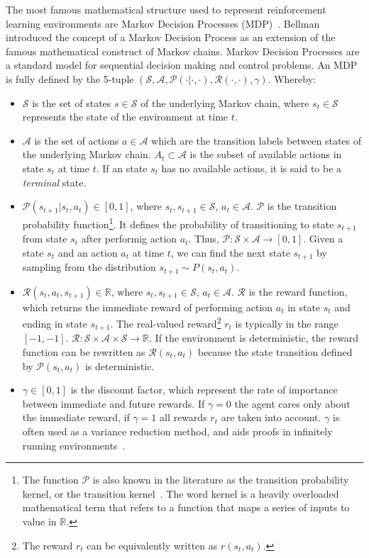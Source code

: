 \documentclass{../main.tex}{subfiles}
\begin{document}
The most famous mathematical structure used to represent reinforcement learning environments are Markov Decision Processes (MDP)~\citep{Bellman1957}. Bellman introduced the concept of a Markov Decision Process as an extension of the famous mathematical construct of Markov chains. Markov Decision Processes are a standard model for sequential decision making and control problems. An MDP is fully defined by the 5-tuple $(\mathcal{S}, \mathcal{A}, \mathcal{P(\cdot | \cdot, \cdot)}, \mathcal{R(\cdot, \cdot)}, \gamma)$. Whereby:

\begin{itemize}
\item $\mathcal{S}$ is the set of states $s \in \mathcal{S}$ of the underlying Markov chain, where $s_t \in \mathcal{S}$ represents the state of the environment at time $t$.
\item $\mathcal{A}$ is the set of actions $a \in \mathcal{A}$ which are the transition labels between states of the underlying Markov chain. $A_t \subset \mathcal{A}$ is the subset of available actions in state $s_t$ at time $t$. If an state $s_t$ has no available actions, it is said to be a \textit{terminal} state.
\item $\mathcal{P}(s_{t+1} | s_t, a_t) \in [0, 1]$, where $s_t, s_{t+1} \in \mathcal{S}$, $a_t \in \mathcal{A}$. $\mathcal{P}$ is the transition probability function\footnote{The function $\mathcal{P}$ is also known in the literature as the transition probability kernel, or the transition kernel~\citep{Tamar2017}. The word kernel is a heavily overloaded mathematical term that refers to a function that maps a series of inputs to value in $\mathbb{R}$.}. It defines the probability of transitioning to state $s_{t+1}$ from state $s_t$ after performig action $a_t$. Thus, $\mathcal{P}: \mathcal{S} \times \mathcal{A} \to [0,1]$. Given a state $s_t$ and an action $a_t$ at time $t$, we can find the next state $s_{t+1}$ by sampling from the distribution $s_{t+1} \sim P(s_t, a_t)$.%
\item $\mathcal{R}(s_t, a_t, s_{t+1}) \in \mathbb{R}$, where $s_t, s_{t+1} \in \mathcal{S}$, $a_t \in \mathcal{A}$. $\mathcal{R}$ is the reward function, which returns the immediate reward of performing action $a_t$ in state $s_t$ and ending in state $s_{t+1}$. The real-valued reward\footnote{The reward $r_t$ can be equivalently written as $r(s_t, a_t)$.} $r_t$ is typically in the range $[-1,-1]$. $\mathcal{R}: \mathcal{S} \times \mathcal{A} \times \mathcal{S} \to \mathbb{R}$. If the environment is deterministic, the reward function can be rewritten as $\mathcal{R}(s_t, a_t)$ because the state transition defined by $\mathcal{P}(s_t, a_t)$ is deterministic.
\item $\gamma \in [0,1]$ is the discount factor, which represent the rate of importance between immediate and future rewards. If $\gamma = 0$ the agent cares only about the immediate reward, if $\gamma = 1$ all rewards $r_t$ are taken into account. $\gamma$ is often used as a variance reduction method, and aids proofs in infinitely running environments~\citep{Sutton1999}.
\end{itemize}
\end{document}
